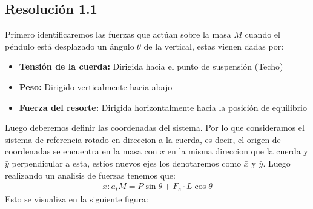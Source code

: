 \documentclass[
  11pt,
  letterpaper,
   addpoints,
   answers
  ]{exam}
\begin{document}
\begin{questions}
\begin{solution}
  \subsection*{Resolución 1.1}
Primero identificaremos las fuerzas que actúan sobre la masa $M$ cuando el péndulo está desplazado un ángulo $\theta$ de la vertical, estas vienen dadas por:
\begin{itemize}
  \item \textbf{Tensión de la cuerda:} Dirigida hacia el punto de suspensión (Techo)
  \item \textbf{Peso:} Dirigido verticalmente hacia abajo
  \item \textbf{Fuerza del resorte:} Dirigida horizontalmente hacia la posición de equilibrio
\end{itemize}
Luego deberemos definir las coordenadas del sistema. Por lo que consideramos el sistema de referencia rotado en direccion a la cuerda, es decir, el origen de coordenadas se encuentra en la masa con $\bar{x}$ en la misma direccion que la cuerda y $\bar{y}$ perpendicular a esta, estios nuevos ejes los denotaremos como $\bar{x}$ y $\bar{y}$. Luego realizando un analisis de fuerzas tenemos que:
\begin{align}
  \text{$\bar{x}$}: a_{t} M = P  \sin\theta + F_e \cdot L \cos\theta 
\end{align}
Esto se visualiza en la siguiente figura:

\begin{figure}[H]
\centering
{}
\end{figure}
\end{solution}
\end{questions}
\end{document}
